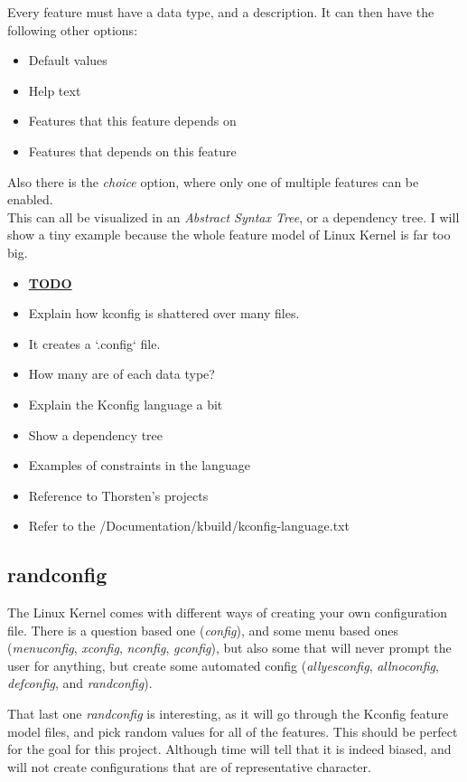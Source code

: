 \documentclass[a4paper,11pt]{article}
\begin{document}
Every feature must have a data type, and a description. It can then have the 
following other options:

\begin{itemize}
    \item Default values
    \item Help text
    \item Features that this feature depends on
    \item Features that depends on this feature
\end{itemize}

Also there is the \emph{choice} option, where only one of multiple features 
can be enabled. \\


This can all be visualized in an \emph{Abstract Syntax Tree}, or a dependency 
tree. I will show a tiny example because the whole feature model of Linux 
Kernel is far too big.


\begin{itemize}
    \item \underline{\textbf{TODO}}
    \item Explain how kconfig is shattered over many files.
    \item It creates a `.config` file.
    \item How many are of each data type?
    \item Explain the Kconfig language a bit
    \item Show a dependency tree
    \item Examples of constraints in the language
    \item Reference to Thorsten's projects
    \item Refer to the /Documentation/kbuild/kconfig-language.txt
\end{itemize}

\subsection{randconfig}

The Linux Kernel comes with different ways of creating your own configuration 
file. There is a question based one (\emph{config}), and some menu based ones 
(\emph{menuconfig}, \emph{xconfig}, \emph{nconfig}, \emph{gconfig}), but also 
some that will never prompt the user for anything, but create some automated 
config (\emph{allyesconfig}, \emph{allnoconfig}, \emph{defconfig}, and 
\emph{randconfig}).

That last one \emph{randconfig} is interesting, as it will go through the 
Kconfig feature model files, and pick random values for all of the features. 
This should be perfect for the goal for this project. Although time will tell 
that it is indeed biased, and will not create configurations that are of 
representative character. 
\end{document}
